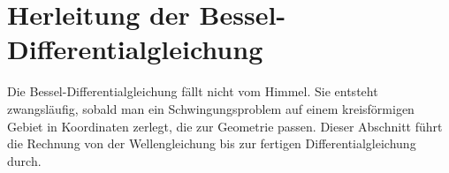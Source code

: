 %
%
%
%
\section{Herleitung der Bessel-Differentialgleichung
\label{bessel:section:herleitung}}
%
%
Die Bessel-Differentialgleichung fällt nicht vom Himmel.
Sie entsteht zwangsläufig, sobald man ein Schwingungsproblem auf einem kreisförmigen Gebiet in Koordinaten zerlegt, die zur Geometrie passen.
Dieser Abschnitt führt die Rechnung von der Wellengleichung bis zur fertigen Differentialgleichung durch.
%
%
